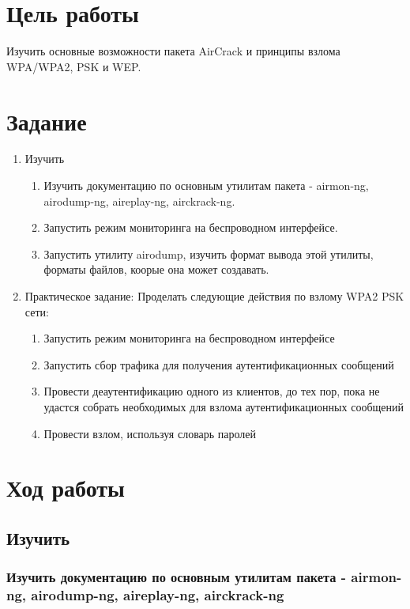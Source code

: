 \documentclass[10pt,a4paper,titlepage]{article}
\begin{document}
\tableofcontents
\newpage

\section{Цель работы}
Изучить основные возможности пакета AirCrack и принципы взлома WPA/WPA2, PSK и WEP.

\section{Задание}
\begin{enumerate}
	\item Изучить
	
\begin{enumerate}
	\item Изучить документацию по основным утилитам пакета - airmon-ng, airodump-ng, aireplay-ng, airckrack-ng.
    \item Запустить режим мониторинга на беспроводном интерфейсе.
    \item Запустить утилиту airodump, изучить формат вывода этой утилиты, форматы файлов, коорые она может создавать.
\end{enumerate}

    \item Практическое задание: Проделать следующие действия по взлому WPA2 PSK сети:
    
\begin{enumerate}
    \item Запустить режим мониторинга на беспроводном интерфейсе
    \item Запустить сбор трафика для получения аутентификационных сообщений
   	\item Провести деаутентификацию одного из клиентов, до тех пор, пока не удастся собрать необходимых для взлома аутентификационных сообщений
    \item Провести взлом, используя словарь паролей
\end{enumerate}


\end{enumerate}

\section{Ход работы}
\subsection{Изучить}
\subsubsection{Изучить документацию по основным утилитам пакета - airmon-ng, airodump-ng, aireplay-ng, airckrack-ng}
\end{document}
